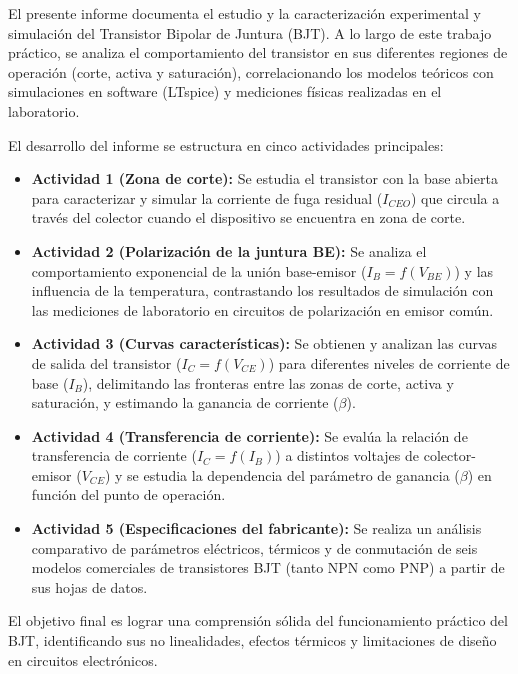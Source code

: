 \documentclass[12pt,a4paper]{article}
\begin{document}
El presente informe documenta el estudio y la caracterización experimental y simulación del Transistor Bipolar de Juntura (BJT). A lo largo de este
trabajo práctico, se analiza el comportamiento del transistor en sus diferentes regiones de operación (corte, activa y saturación), correlacionando
los modelos teóricos con simulaciones en software (LTspice) y mediciones físicas realizadas en el laboratorio.

El desarrollo del informe se estructura en cinco actividades principales:
\begin{itemize}
    \item \textbf{Actividad 1 (Zona de corte):} Se estudia el transistor con la base abierta para caracterizar y simular
          la corriente de fuga residual ($I_{CEO}$) que circula a través del colector cuando el dispositivo se encuentra en zona de corte.
    \item \textbf{Actividad 2 (Polarización de la juntura BE):} Se analiza el comportamiento exponencial de la unión
          base-emisor ($I_B = f(V_{BE})$) y las  influencia de la temperatura, contrastando los resultados de simulación
          con las mediciones de laboratorio en circuitos de polarización en emisor común.
    \item \textbf{Actividad 3 (Curvas características):} Se obtienen y analizan las curvas de salida del transistor
          ($I_C = f(V_{CE})$) para diferentes niveles de corriente de base ($I_B$), delimitando las fronteras entre las
          zonas de corte, activa y saturación, y estimando la ganancia de corriente ($\beta$).
    \item \textbf{Actividad 4 (Transferencia de corriente):} Se evalúa la relación de transferencia de corriente ($I_C =
          f(I_B)$) a distintos voltajes de colector-emisor ($V_{CE}$) y se estudia la dependencia del parámetro de
          ganancia ($\beta$) en función del punto de operación.
    \item \textbf{Actividad 5 (Especificaciones del fabricante):} Se realiza un análisis comparativo de parámetros
          eléctricos, térmicos y de conmutación de seis modelos comerciales de transistores BJT (tanto NPN como PNP) a
          partir de sus hojas de datos.
\end{itemize}

El objetivo final es lograr una comprensión sólida del funcionamiento práctico del BJT, identificando sus no
linealidades, efectos térmicos y limitaciones de diseño en circuitos electrónicos.
\newpage
\end{document}
